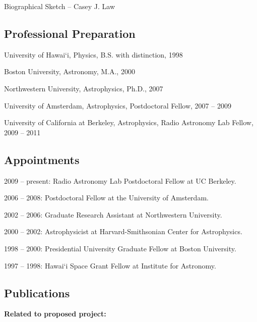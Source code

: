 \documentclass[11pt]{article}
\begin{document}
\thispagestyle{empty}

\begin{center}
\Large{Biographical Sketch -- Casey J. Law}
\end{center}

\subsection*{Professional Preparation}
\indent 

University of Hawai`i, Physics, B.S. with distinction, 1998

Boston University, Astronomy, M.A., 2000

Northwestern University, Astrophysics, Ph.D., 2007

University of Amsterdam, Astrophysics, Postdoctoral Fellow, 2007 -- 2009

University of California at Berkeley, Astrophysics, Radio Astronomy Lab Fellow, 2009 -- 2011

\subsection*{Appointments}
\indent

2009 -- present:  Radio Astronomy Lab Postdoctoral Fellow at UC Berkeley.

2006 -- 2008: Postdoctoral Fellow at the University of Amsterdam.

2002 -- 2006:  Graduate Research Assistant at Northwestern University.

2000 -- 2002:  Astrophysicist at Harvard-Smithsonian Center for Astrophysics.

1998 -- 2000:  Presidential University Graduate Fellow at Boston University.

1997 -- 1998:  Hawai`i Space Grant Fellow at Institute for Astronomy.

\subsection*{Publications}
\indent

{\bf Related to proposed project:}
\end{document}
